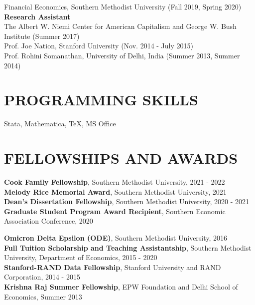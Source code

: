 \documentclass[11pt]{res}
\begin{document}
\begin{resume}
Financial Economics, Southern Methodist University (Fall 2019, Spring 2020)\vspace{1.5mm}\\
{\bf Research Assistant}\vspace{2mm}\\
The Albert W. Niemi Center for American Capitalism and George W. Bush Institute (Summer 2017)\vspace{1.5mm}\\
Prof. Joe Nation, Stanford University (Nov. 2014 - July 2015)\vspace{1.5mm}\\
Prof. Rohini Somanathan, University of Delhi, India (Summer 2013, Summer 2014)


\section{PROGRAMMING SKILLS}\vspace{2mm}
Stata, Mathematica, \TeX, MS Office

\section{FELLOWSHIPS AND AWARDS}\vspace{2mm}
{\bf Cook Family Fellowship}, Southern Methodist University, 2021 - 2022\vspace{1.5mm}\\
{\bf Melody Rice Memorial Award}, Southern Methodist University, 2021\vspace{1.5mm}\\
{\bf Dean's Dissertation Fellowship}, Southern Methodist University, 2020 - 2021\vspace{1.5mm}\\
{\bf Graduate Student Program Award Recipient}, Southern Economic Association Conference, 2020

\newpage
\phantom{.}\vspace{.4cm}

{\bf Omicron Delta Epsilon (ODE)}, Southern Methodist University, 2016\vspace{1.5mm}\\
{\bf Full Tuition Scholarship and Teaching Assistantship}, Southern Methodist University, Department of Economics, 2015 - 2020\vspace{1.5mm}\\
{\bf Stanford-RAND Data Fellowship}, Stanford University and RAND Corporation, 2014 - 2015\vspace{1.5mm}\\
{\bf Krishna Raj Summer Fellowship}, EPW Foundation and Delhi School of Economics, Summer 2013


\end{resume}
\end{document}
